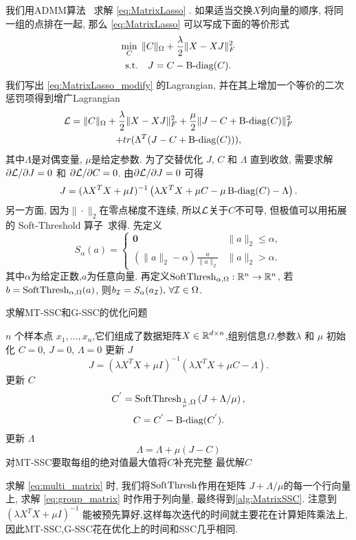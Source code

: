 我们用ADMM算法~\cite{stephen2011distributed} 求解 \eqref{eq:MatrixLasso} .
如果适当交换\(X\)列向量的顺序, 将同一组的点排在一起, 
那么 \eqref{eq:MatrixLasso} 可以写成下面的等价形式
\begin{equation}\label{eq:MatrixLasso_modify}
  \begin{gathered}
    \min_{C} \; \|C\|_{\Omega}+\frac{\lambda}{2}\|X-XJ\|_F^2 \\
    \text{s.t.} \quad J=C-\operatorname{B-diag}(C).
  \end{gathered}
\end{equation}
我们写出 \eqref{eq:MatrixLasso_modify} 的Lagrangian,
并在其上增加一个等价的二次惩罚项得到增广Lagrangian
\begin{multline*}
  \mathcal{L}= \|C\|_{\Omega}+\frac{\lambda}{2}\|X-XJ\|_F^2 
  +\frac{\mu}{2}\|J-C+\operatorname{B-diag}(C)\|_F^2\\
  +tr(\Lambda^T(J-C+\operatorname{B-diag}(C))),
\end{multline*}
其中\(\Lambda\)是对偶变量, \(\mu\)是给定参数. 为了交替优化
\(J\), \(C\) 和 \(\Lambda\) 直到收敛, 需要求解 \(\partial \mathcal{L}/\partial J=0\)
和 \(\partial \mathcal{L}/\partial C=0\). 由\(\partial \mathcal{L}/\partial J=0\) 可得
\[
  J=(\lambda X^TX+\mu I)^{-1}\left(\lambda X^TX+\mu C - 
  \mu\operatorname{B-diag}(C)-\Lambda\right).
\]
另一方面, 因为\(\|\cdot\|_2\)在零点梯度不连续,
所以\(\mathcal{L}\)关于\(C\)不可导, 但极值可以用拓展的
Soft-Threshold 算子~\cite{donoho1995noising}求得.
先定义
\begin{equation*}
  S_\alpha(a) = \begin{cases}
    \mathbf{0} & \|a\|_2 \le \alpha, \\
    (\|a\|_2 - \alpha) \frac{a}{\|a\|_2} & \|a\|_2 > \alpha.
  \end{cases}
\end{equation*}
其中\(\alpha\)为给定正数,\(a\)为任意向量.
再定义\(\operatorname{SoftThresh}_{\alpha,\Omega}:\mathbb{R}^n\rightarrow \mathbb{R}^n\), 若
\(b =\operatorname{SoftThresh}_{\alpha,\Omega}(a)\), 则\( b_{\mathcal{I}}= S_\alpha(a_{\mathcal{I}}),
\, \forall \mathcal{I} \in \Omega\).

\begin{algorithm}[tb]
  \caption{求解MT-SSC和G-SSC的优化问题}
  \label{alg:MatrixSSC}
  \begin{algorithmic}
    \(n\) 个样本点 \(x_1,\ldots,x_n\),它们组成了数据矩阵\(X\in \mathbb{R}^{d\times
    n}\),组别信息\(\Omega\),参数\(\lambda\) 和 \(\mu\)
    \State 初始化 \(C=0\), \(J=0\), \(\Lambda=0\)
     更新 \(J\) 
    \[J=(\lambda X^TX+\mu I)^{-1}(\lambda X^TX+\mu C-\Lambda).\]
     更新 \(C\)
    \[ C^{'}=\operatorname{SoftThresh}_{\frac{1}{\mu},\Omega}\left(J+\Lambda/\mu\right), \]
    \[ C=C^{'}-\operatorname{B-diag}(C^{'}).\]
     更新 \(\Lambda\)
    \[\Lambda=\Lambda+\mu(J-C)\]
    \EndWhile
    \State 对MT-SSC要取每组的绝对值最大值将\(C\)补充完整
     最优解\(C\)
  \end{algorithmic}
\end{algorithm}
求解 \eqref{eq:multi_matrix} 时, 我们将\(\operatorname{SoftThresh}\)作用在矩阵
\(J+\Lambda/\mu\)的每一个行向量上,
求解 \eqref{eq:group_matrix} 时作用于列向量,
最终得到\autoref{alg:MatrixSSC}.
注意到 \((\lambda X^TX+\mu I)^{-1}\)
能被预先算好,这样每次迭代的时间就主要花在计算矩阵乘法上,
因此MT-SSC,G-SSC花在优化上的时间和SSC几乎相同.
